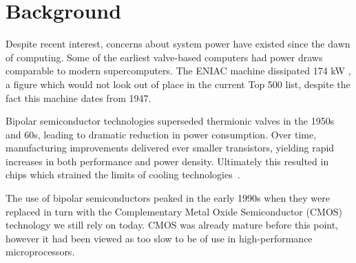 \section{Background}
\label{sec:background}
Despite recent interest, concerns about system power have existed since the dawn of computing. Some of the earliest valve-based computers had power draws comparable to modern supercomputers. The ENIAC machine dissipated 174 kW \cite{birnbaum:2000aa}, a figure which would not look out of place in the current Top 500 list, despite the fact this machine dates from 1947.\golden

Bipolar semiconductor technologies superseded thermionic valves in the 1950s and 60s, leading to dramatic reduction in power consumption. Over time, manufacturing improvements delivered ever smaller transistors, yielding rapid increases in both performance and power density. Ultimately this resulted in chips which strained the limits of cooling technologies~\cite{jouppi:1994aa}. \golden

The use of bipolar semiconductors peaked in the early 1990s when they were replaced in turn with the Complementary Metal Oxide Semiconductor (CMOS) technology we still rely on today. CMOS was already mature before this point, however it had been viewed as too slow to be of use in high-performance microprocessors. \golden

